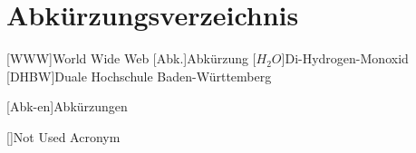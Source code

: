%                                              
%

\chapter*{Abkürzungsverzeichnis} %

\begin{acronym}[12345678910]
	[WWW]{World Wide Web}
	[Abk.]{Abkürzung}
	[\ensuremath{H_2O}]{Di-Hydrogen-Monoxid}
	[DHBW]{Duale Hochschule Baden-Württemberg}


	[Abk-en]{Abkürzungen}

	[]{Not Used Acronym}
	
\end{acronym}
